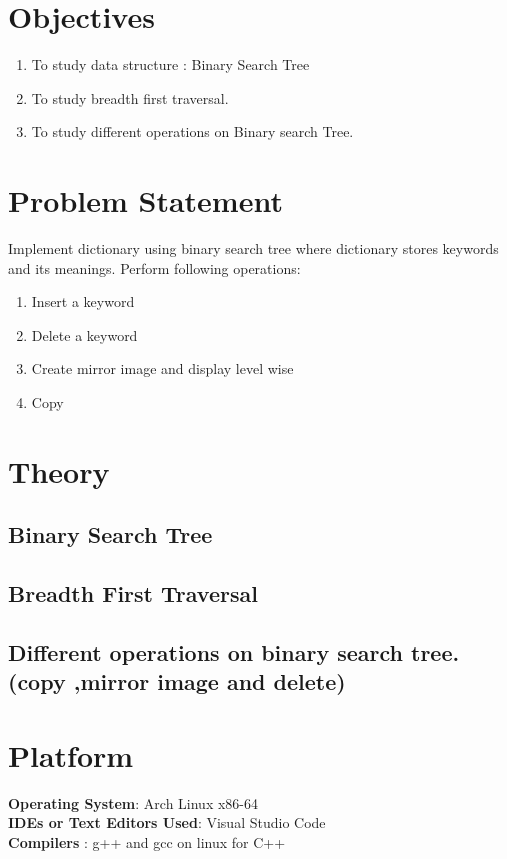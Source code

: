 \documentclass[11pt]{article}
\begin{document}
\tableofcontents
\thispagestyle{empty}
\clearpage

\setcounter{page}{1}

\section{Objectives}
\begin{enumerate}
	\item To study data structure : Binary Search Tree
	\item To study breadth first traversal.
	\item To study different operations on Binary search Tree.
\end{enumerate}

\section{Problem Statement}
Implement dictionary using binary search tree where dictionary stores keywords and its meanings.
Perform following operations:
\begin{enumerate}
	\item Insert a keyword
	\item Delete a keyword
	\item Create mirror image and display level wise
	\item Copy
\end{enumerate}

\section{Theory}
\subsection{Binary Search Tree}

\subsection{Breadth First Traversal}

\subsection{Different operations on binary search tree.(copy ,mirror image and delete)}

\section{Platform}
\textbf{Operating System}: Arch Linux x86-64 \\
\textbf{IDEs or Text Editors Used}: Visual Studio Code\\
\textbf{Compilers} : g++ and gcc on linux for C++\\
\end{document}
